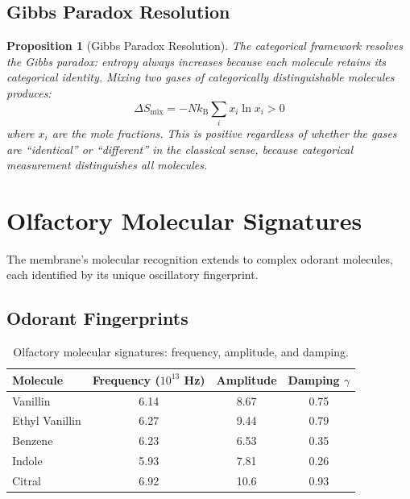 \documentclass[twocolumn,10pt,a4paper]{article}
\newtheorem{proposition}[theorem]{Proposition}
\theoremstyle{definition}
\theoremstyle{remark}
\newcommand{\kB}{k_{\mathrm{B}}}
\begin{document}
\subsection{Gibbs Paradox Resolution}

\begin{proposition}[Gibbs Paradox Resolution]
\label{prop:gibbs}
The categorical framework resolves the Gibbs paradox: entropy always increases because each molecule retains its categorical identity. Mixing two gases of categorically distinguishable molecules produces:
\begin{equation}
\label{eq:gibbs}
\Delta S_{\mathrm{mix}} = -N \kB \sum_i x_i \ln x_i > 0
\end{equation}
where $x_i$ are the mole fractions. This is positive regardless of whether the gases are ``identical'' or ``different'' in the classical sense, because categorical measurement distinguishes all molecules.
\end{proposition}


\section{Olfactory Molecular Signatures}
\label{sec:olfactory}

The membrane's molecular recognition extends to complex odorant molecules, each identified by its unique oscillatory fingerprint.

\subsection{Odorant Fingerprints}

\begin{table}[H]
\centering
\caption{Olfactory molecular signatures: frequency, amplitude, and damping.}
\label{tab:olfactory}
\begin{tabular}{@{}lccc@{}}
\toprule
Molecule & Frequency ($10^{13}$ Hz) & Amplitude & Damping $\gamma$ \\
\midrule
Vanillin & 6.14 & 8.67 & 0.75 \\
Ethyl Vanillin & 6.27 & 9.44 & 0.79 \\
Benzene & 6.23 & 6.53 & 0.35 \\
Indole & 5.93 & 7.81 & 0.26 \\
Citral & 6.92 & 10.6 & 0.93 \\
\bottomrule
\end{tabular}
\end{table}
\end{document}

